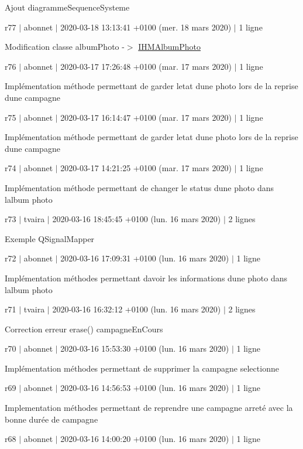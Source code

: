 Ajout diagramme\+Sequence\+Systeme

r77 $\vert$ abonnet $\vert$ 2020-\/03-\/18 13\+:13\+:41 +0100 (mer. 18 mars 2020) $\vert$ 1 ligne

Modification classe album\+Photo -\/$>$ \hyperlink{class_i_h_m_album_photo}{I\+H\+M\+Album\+Photo}

r76 $\vert$ abonnet $\vert$ 2020-\/03-\/17 17\+:26\+:48 +0100 (mar. 17 mars 2020) $\vert$ 1 ligne

Implémentation méthode permettant de garder l\textquotesingle{}etat d\textquotesingle{}une photo lors de la reprise d\textquotesingle{}une campagne

r75 $\vert$ abonnet $\vert$ 2020-\/03-\/17 16\+:14\+:47 +0100 (mar. 17 mars 2020) $\vert$ 1 ligne

Implémentation méthode permettant de garder l\textquotesingle{}etat d\textquotesingle{}une photo lors de la reprise d\textquotesingle{}une campagne

r74 $\vert$ abonnet $\vert$ 2020-\/03-\/17 14\+:21\+:25 +0100 (mar. 17 mars 2020) $\vert$ 1 ligne

Implémentation méthode permettant de changer le status d\textquotesingle{}une photo dans l\textquotesingle{}album photo

r73 $\vert$ tvaira $\vert$ 2020-\/03-\/16 18\+:45\+:45 +0100 (lun. 16 mars 2020) $\vert$ 2 lignes

Exemple Q\+Signal\+Mapper

r72 $\vert$ abonnet $\vert$ 2020-\/03-\/16 17\+:09\+:31 +0100 (lun. 16 mars 2020) $\vert$ 1 ligne

Implémentation méthodes permettant d\textquotesingle{}avoir les informations d\textquotesingle{}une photo dans l\textquotesingle{}album photo

r71 $\vert$ tvaira $\vert$ 2020-\/03-\/16 16\+:32\+:12 +0100 (lun. 16 mars 2020) $\vert$ 2 lignes

Correction erreur erase() campagne\+En\+Cours

r70 $\vert$ abonnet $\vert$ 2020-\/03-\/16 15\+:53\+:30 +0100 (lun. 16 mars 2020) $\vert$ 1 ligne

Implémentation méthodes permettant de supprimer la campagne selectionne

r69 $\vert$ abonnet $\vert$ 2020-\/03-\/16 14\+:56\+:53 +0100 (lun. 16 mars 2020) $\vert$ 1 ligne

Implementation méthodes permettant de reprendre une campagne arreté avec la bonne durée de campagne

r68 $\vert$ abonnet $\vert$ 2020-\/03-\/16 14\+:00\+:20 +0100 (lun. 16 mars 2020) $\vert$ 1 ligne

